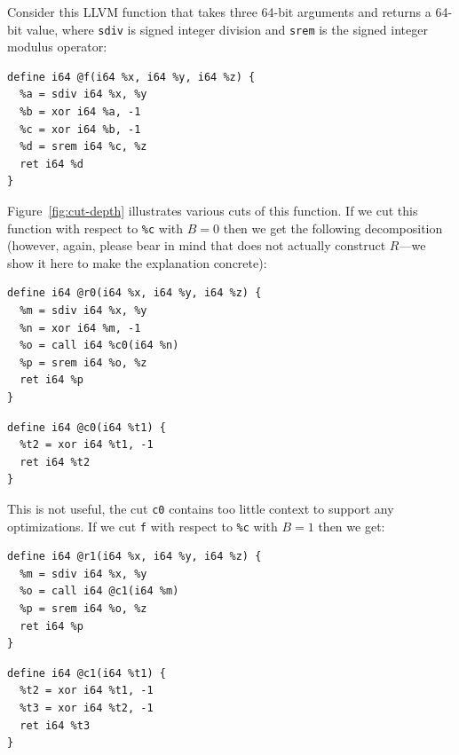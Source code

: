 Consider this LLVM function that takes three 64-bit arguments and
returns a 64-bit value, where \texttt{sdiv} is signed integer division
and \texttt{srem} is the signed integer modulus operator:


{\begin{quoting}
\begin{Verbatim}
define i64 @f(i64 %x, i64 %y, i64 %z) {
  %a = sdiv i64 %x, %y
  %b = xor i64 %a, -1
  %c = xor i64 %b, -1
  %d = srem i64 %c, %z
  ret i64 %d
}
\end{Verbatim}
\end{quoting}}

Figure~\ref{fig:cut-depth} illustrates various cuts of this function.
%
If we cut this function with respect to \texttt{\%c} with $B = 0$ then
we get the following decomposition (however, again, please bear in
mind that \minotaur{} does not actually construct $R$---we show it here to
make the explanation concrete):

{\begin{quoting}
\begin{Verbatim}
define i64 @r0(i64 %x, i64 %y, i64 %z) {
  %m = sdiv i64 %x, %y
  %n = xor i64 %m, -1
  %o = call i64 %c0(i64 %n)
  %p = srem i64 %o, %z
  ret i64 %p
}
\end{Verbatim}
\end{quoting}}
{\begin{quoting}
\begin{Verbatim}
define i64 @c0(i64 %t1) {
  %t2 = xor i64 %t1, -1
  ret i64 %t2
}
\end{Verbatim}
\end{quoting}}


This is not useful, the cut \texttt{c0} contains too little context
to support any optimizations.
%
If we cut \texttt{f} with respect to \texttt{\%c} with $B = 1$ then we get:

{\begin{quoting}
\begin{Verbatim}
define i64 @r1(i64 %x, i64 %y, i64 %z) {
  %m = sdiv i64 %x, %y
  %o = call i64 @c1(i64 %m)
  %p = srem i64 %o, %z
  ret i64 %p
}
\end{Verbatim}
\end{quoting}}

{\begin{quoting}
\begin{Verbatim}
define i64 @c1(i64 %t1) {
  %t2 = xor i64 %t1, -1
  %t3 = xor i64 %t2, -1
  ret i64 %t3
}
\end{Verbatim}
\end{quoting}}


